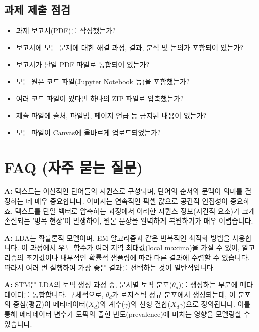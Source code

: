 \documentclass[11pt,a4paper]{article}
\theoremstyle{definition}
\begin{document}
{\subsection*{과제 제출 점검}
\begin{itemize}
    \item 과제 보고서(PDF)를 작성했는가?
    \item 보고서에 모든 문제에 대한 해결 과정, 결과, 분석 및 논의가 포함되어 있는가?
    \item 보고서가 단일 PDF 파일로 통합되어 있는가?
    \item 모든 원본 코드 파일(Jupyter Notebook 등)을 포함했는가?
    \item 여러 코드 파일이 있다면 하나의 ZIP 파일로 압축했는가?
    \item 제출 파일에 출처, 파일명, 페이지 언급 등 금지된 내용이 없는가?
    \item 모든 파일이 Canvas에 올바르게 업로드되었는가?
\end{itemize}

\newpage
\section{FAQ (자주 묻는 질문)}

\begin{tcolorbox}[title=Q: 텍스트 오토인코더가 이미지 오토인코더보다 어려운 이유는 무엇인가요?]
\textbf{A:} 텍스트는 이산적인 단어들의 시퀀스로 구성되며, 단어의 순서와 문맥이 의미를 결정하는 데 매우 중요합니다. 이미지는 연속적인 픽셀 값으로 공간적 인접성이 중요하죠. 텍스트를 단일 벡터로 압축하는 과정에서 이러한 시퀀스 정보(시간적 요소)가 크게 손실되는 '병목 현상'이 발생하여, 원본 문장을 완벽하게 복원하기가 매우 어렵습니다.
\end{tcolorbox}

\begin{tcolorbox}[title=Q: LDA는 왜 실행할 때마다 결과가 달라질 수 있나요?]
\textbf{A:} LDA는 확률론적 모델이며, EM 알고리즘과 같은 반복적인 최적화 방법을 사용합니다. 이 과정에서 우도 함수가 여러 지역 최대값(local maxima)을 가질 수 있어, 알고리즘의 초기값이나 내부적인 확률적 샘플링에 따라 다른 결과에 수렴할 수 있습니다. 따라서 여러 번 실행하여 가장 좋은 결과를 선택하는 것이 일반적입니다.
\end{tcolorbox}

\begin{tcolorbox}[title=Q: STM에서 메타데이터는 어떻게 토픽 모델링에 활용되나요?]
\textbf{A:} STM은 LDA의 토픽 생성 과정 중, 문서별 토픽 분포($\theta_d$)를 생성하는 부분에 메타데이터를 통합합니다. 구체적으로, $\theta_d$가 로지스틱 정규 분포에서 생성되는데, 이 분포의 중심(평균)이 메타데이터($X_d$)와 계수($\gamma$)의 선형 결합($X_d \gamma$)으로 정의됩니다. 이를 통해 메타데이터 변수가 토픽의 출현 빈도(prevalence)에 미치는 영향을 모델링할 수 있습니다.
\end{tcolorbox}

}
\end{document}
